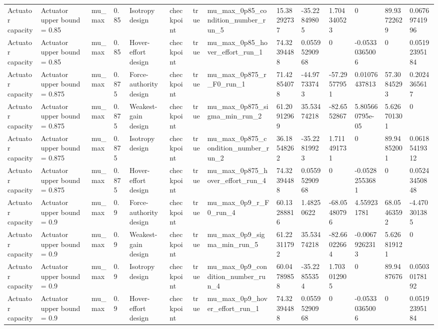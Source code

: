 \begin{tabular}{@{}llllllllllllll@{}}
Actuator capacity & Actuator upper bound = 0.85 & mu\_max & 0.85 & Isotropy design & checkpoint & true & mu\_max\_0p85\_condition\_number\_run\_5 & 15.38292737 & -35.22849805 & 1.704340523 & 0 & 89.93722629 & 0.06769741996 \\
Actuator capacity & Actuator upper bound = 0.85 & mu\_max & 0.85 & Hover-effort design & checkpoint & true & mu\_max\_0p85\_hover\_effort\_run\_1 & 74.32394488 & 0.05595290968 & 0 & -0.05330365006 & 0 & 0.05192395184 \\
Actuator capacity & Actuator upper bound = 0.875 & mu\_max & 0.875 & Force-authority design & checkpoint & true & mu\_max\_0p875\_r\_F0\_run\_1 & 71.42854078 & -44.97733743 & -57.29577951 & 0.01076437813 & 57.30845293 & 0.2024365617 \\
Actuator capacity & Actuator upper bound = 0.875 & mu\_max & 0.875 & Weakest-gain design & checkpoint & true & mu\_max\_0p875\_sigma\_min\_run\_2 & 61.20912969 & 35.53474218 & -82.6552867 & 5.805660795e-05 & 5.626701301 & 0 \\
Actuator capacity & Actuator upper bound = 0.875 & mu\_max & 0.875 & Isotropy design & checkpoint & true & mu\_max\_0p875\_condition\_number\_run\_2 & 36.18548262 & -35.22819923 & 1.711491731 & 0 & 89.94852001 & 0.06185419312 \\
Actuator capacity & Actuator upper bound = 0.875 & mu\_max & 0.875 & Hover-effort design & checkpoint & true & mu\_max\_0p875\_hover\_effort\_run\_4 & 74.32394488 & 0.05595290968 & 0 & -0.05282553681 & 0 & 0.05243450848 \\
Actuator capacity & Actuator upper bound = 0.9 & mu\_max & 0.9 & Force-authority design & checkpoint & true & mu\_max\_0p9\_r\_F0\_run\_4 & 60.13288816 & 1.48250622 & -68.05480796 & 4.559231781 & 68.05463592 & -4.470301385 \\
Actuator capacity & Actuator upper bound = 0.9 & mu\_max & 0.9 & Weakest-gain design & checkpoint & true & mu\_max\_0p9\_sigma\_min\_run\_5 & 61.22311792 & 35.53474218 & -82.66022664 & -0.00679262313 & 5.626819121 & 0 \\
Actuator capacity & Actuator upper bound = 0.9 & mu\_max & 0.9 & Isotropy design & checkpoint & true & mu\_max\_0p9\_condition\_number\_run\_4 & 60.04789858 & -35.22855354 & 1.703012905 & 0 & 89.9487676 & 0.05030178192 \\
Actuator capacity & Actuator upper bound = 0.9 & mu\_max & 0.9 & Hover-effort design & checkpoint & true & mu\_max\_0p9\_hover\_effort\_run\_1 & 74.32394488 & 0.05595290968 & 0 & -0.05330365006 & 0 & 0.05192395184 \\

\end{tabular}
